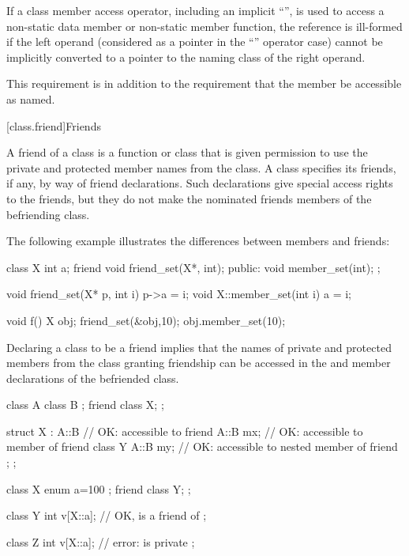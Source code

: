 \pnum
If a class member access operator, including an implicit
``'',
is used to access a non-static data member or non-static
member function, the reference is ill-formed if the
left operand (considered as a pointer in the
``''
operator case) cannot be implicitly converted to a
pointer to the naming class of the right operand.
\begin{note}
This requirement is in addition to the requirement that
the member be accessible as named.
\end{note}

[class.friend]{Friends}%
%

\pnum
A friend of a class is a function or class that is
given permission to use the private and protected member names from the class.
A class specifies its friends, if any, by way of friend declarations.
Such declarations give special access rights to the friends, but they
do not make the nominated friends members of the befriending class.
\begin{example}
The following example illustrates the differences between
members and friends:
%

\begin{codeblock}
class X {
  int a;
  friend void friend_set(X*, int);
public:
  void member_set(int);
};

void friend_set(X* p, int i) { p->a = i; }
void X::member_set(int i) { a = i; }

void f() {
  X obj;
  friend_set(&obj,10);
  obj.member_set(10);
}
\end{codeblock}
\end{example}

\pnum
{}%
Declaring a class to be a friend implies that the names of private and
protected members from the class granting friendship can be accessed in the
 and member declarations of the befriended
class. \begin{example}

\begin{codeblock}
class A {
  class B { };
  friend class X;
};

struct X : A::B {               // OK:  accessible to friend
  A::B mx;                      // OK:  accessible to member of friend
  class Y {
    A::B my;                    // OK:  accessible to nested member of friend
  };
};
\end{codeblock}
\end{example}
\begin{example}

\begin{codeblock}
class X {
  enum { a=100 };
  friend class Y;
};

class Y {
  int v[X::a];                  // OK,  is a friend of 
};

class Z {
  int v[X::a];                  // error:  is private
};
\end{codeblock}
\end{example}

